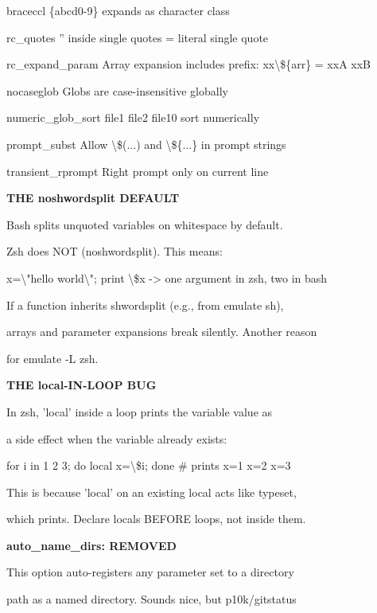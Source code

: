 \documentclass[11pt,a4paper,twoside]{book}
\begin{document}
braceccl          \{abcd0-9\} expands as character class

rc\_quotes         '' inside single quotes = literal single quote

rc\_expand\_param   Array expansion includes prefix: xx\textbackslash{}\$\{arr\} = xxA xxB

nocaseglob        Globs are case-insensitive globally

numeric\_glob\_sort  file1 file2 file10 sort numerically

prompt\_subst       Allow \textbackslash{}\$(...) and \textbackslash{}\$\{...\} in prompt strings

transient\_rprompt  Right prompt only on current line


\vspace{12pt}
{\bfseries\color{neonyellow} THE noshwordsplit DEFAULT}\vspace{4pt}

Bash splits unquoted variables on whitespace by default.

Zsh does NOT (noshwordsplit). This means:

x=\textbackslash{}"hello world\textbackslash{}"; print \textbackslash{}\$x  -> one argument in zsh, two in bash

If a function inherits shwordsplit (e.g., from emulate sh),

arrays and parameter expansions break silently. Another reason

for emulate -L zsh.


\vspace{12pt}
{\bfseries\color{neonyellow} THE local-IN-LOOP BUG}\vspace{4pt}

In zsh, 'local' inside a loop prints the variable value as

a side effect when the variable already exists:

for i in 1 2 3; do local x=\textbackslash{}\$i; done  \# prints x=1 x=2 x=3

This is because 'local' on an existing local acts like typeset,

which prints. Declare locals BEFORE loops, not inside them.


\vspace{12pt}
{\bfseries\color{neonyellow} auto\_name\_dirs: REMOVED}\vspace{4pt}

This option auto-registers any parameter set to a directory

path as a named directory. Sounds nice, but p10k/gitstatus
\end{document}
